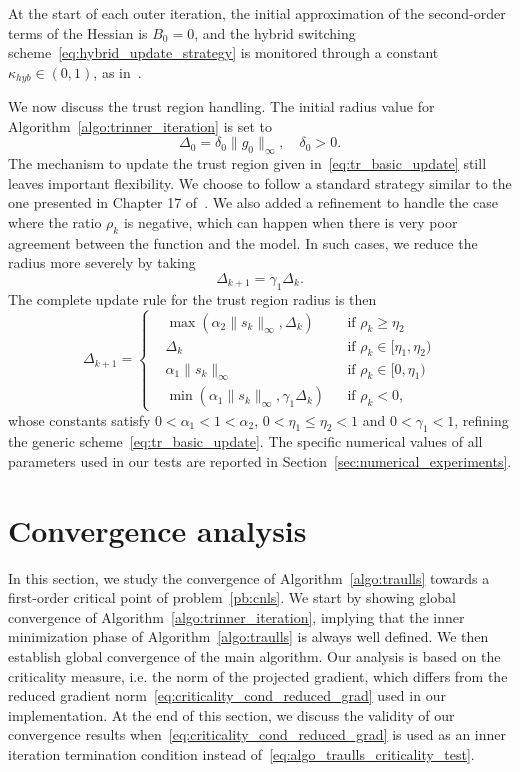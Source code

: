 \documentclass{article}
\numberwithin{equation}{section}
\theoremstyle{plain}
\begin{document}
	At the start of each outer iteration, the initial approximation of the second-order terms of the Hessian is $B_0 = 0$, and the hybrid switching scheme~\eqref{eq:hybrid_update_strategy} is monitored through a constant $\kappa_{hyb} \in (0,1)$, as in~\cite{tjoabiegler:1991}.
	
	We now discuss the trust region handling. The initial radius value for Algorithm~\ref{algo:trinner_iteration} is set to
	\begin{equation*}
		\Delta_0 = \delta_0 \| g_0\|_\infty, \quad \delta_0 > 0.
	\end{equation*}
	The mechanism to update the trust region given in~\eqref{eq:tr_basic_update} still leaves important flexibility. We choose to follow a standard strategy similar to the one presented in Chapter 17 of~\cite{conn-etal:2000}. We also added a refinement to handle the case where the ratio $\rho_k$ is negative, which can happen when there is very poor agreement between the function and the model. In such cases, we reduce the radius more severely by taking
	\[\Delta_{k+1} = \gamma_1 \Delta_k.\]
	The complete update rule for the trust region radius is then
	\begin{equation*}
		\Delta_{k+1} = \left\{\begin{aligned}
			& \max\left(\alpha_2 \|s_k\|_\infty,\Delta_k\right) & &\text{if } \rho_k \ge \eta_2 \\
			& \Delta_k &  &\text{if } \rho_k \in [\eta_1,\eta_2) \\
			& \alpha_1\|s_k\|_\infty & &\text{if } \rho_k \in [0,\eta_1) \\
			& \min\left(\alpha_1 \|s_k\|_\infty,\gamma_1\Delta_k\right) & &\text{if } \rho_k < 0,
		\end{aligned}\right.
	\end{equation*}
	whose constants satisfy $0 < \alpha_1 < 1 < \alpha_2$, $0 < \eta_1 \le \eta_2 < 1$ and $0 < \gamma_1 < 1$, refining the generic scheme~\eqref{eq:tr_basic_update}. The specific numerical values of all parameters used in our tests are reported in Section~\ref{sec:numerical_experiments}.
	
	
	\section{Convergence analysis}\label{sec:convergence_analysis}
	
	In this section, we study the convergence of Algorithm~\ref{algo:traulls} towards a first-order critical point of problem~\eqref{pb:cnls}. We start by showing global convergence of Algorithm~\ref{algo:trinner_iteration}, implying that the inner minimization phase of Algorithm~\ref{algo:traulls} is always well defined. We then establish global convergence of the main algorithm. Our analysis is based on the criticality measure, i.e. the norm of the projected gradient, which differs from the reduced gradient norm~\eqref{eq:criticality_cond_reduced_grad} used in our implementation. At the end of this section, we discuss the validity of our convergence results when~\eqref{eq:criticality_cond_reduced_grad} is used as an inner iteration termination condition instead of~\eqref{eq:algo_traulls_criticality_test}.
	
\end{document}
